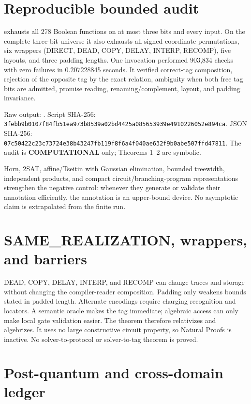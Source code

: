 \documentclass[11pt]{article}
\newcommand{\COMP}{\textbf{COMPUTATIONAL}}
\begin{document}
\section{Reproducible bounded audit}

exhausts all 278 Boolean functions on at most three bits and every input.  On
the complete three-bit universe it also exhausts all signed coordinate
permutations, six wrappers (DIRECT, DEAD, COPY, DELAY, INTERP, RECOMP), five
layouts, and three padding lengths.  One invocation performed 903,834 checks
with zero failures in 0.207228845 seconds.  It verified correct-tag
composition, rejection of the opposite tag by the exact relation, ambiguity
when both free tag bits are admitted, promise reading, renaming/complement,
layout, and padding invariance.

Raw output:
.
Script SHA-256:
\texttt{3febb9b0107f84fb51ea973b8539a02bd4425a085653939e4910226052e894ca}.
JSON SHA-256:
\texttt{07c50422c23c73724e38b43247fb119f8f6a4f040ae632f9b0abe507ffd47811}.
The audit is \COMP{} only; Theorems 1--2 are symbolic.

Horn, 2SAT, affine/Tseitin with Gaussian elimination, bounded treewidth,
independent products, and compact circuit/branching-program representations
strengthen the negative control: whenever they generate or validate their
annotation efficiently, the annotation is an upper-bound device.  No
asymptotic claim is extrapolated from the finite run.

\section{SAME\_REALIZATION, wrappers, and barriers}

DEAD, COPY, DELAY, INTERP, and RECOMP can change traces and storage without
changing the compiler-reader composition.  Padding only weakens bounds stated
in padded length.  Alternate encodings require charging recognition and
locators.  A semantic oracle makes the tag immediate; algebraic access can
only make local gate validation easier.  The theorem therefore relativizes
and algebrizes.  It uses no large constructive circuit property, so Natural
Proofs is inactive.  No solver-to-protocol or solver-to-tag theorem is proved.

\section{Post-quantum and cross-domain ledger}
\end{document}
